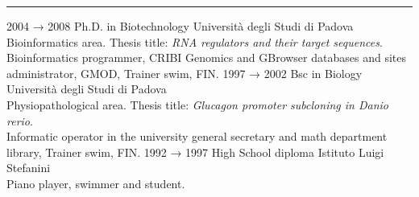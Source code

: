 \documentclass[8pt]{stackoverflow-upgraded-version} %
\begin{document}
\textcolor{stackoverflow}{\hrule}
\vspace{\baselineskip} %
\begin{entrylist}
	\entry
		{2004 → 2008}
		{Ph.D. in Biotechnology}
		{Università degli Studi di Padova}
		{\\
		Bioinformatics area. Thesis title: \emph{RNA regulators and their target sequences}.\\
		Bioinformatics programmer, CRIBI Genomics and GBrowser databases and sites administrator, GMOD, Trainer swim, FIN.}
	\entry
		{1997 → 2002}
		{Bsc in Biology}
		{Università degli Studi di Padova}
		{\\
		Physiopathological area. Thesis title: \emph{Glucagon promoter subcloning in Danio rerio}.\\
		Informatic operator in the university general secretary and math department library, Trainer swim, FIN.}
	\entry
		{1992 → 1997}
		{High School diploma}
		{Istituto Luigi Stefanini}
		{\\
		Piano player, swimmer and student.}
\end{entrylist}
\end{document}
